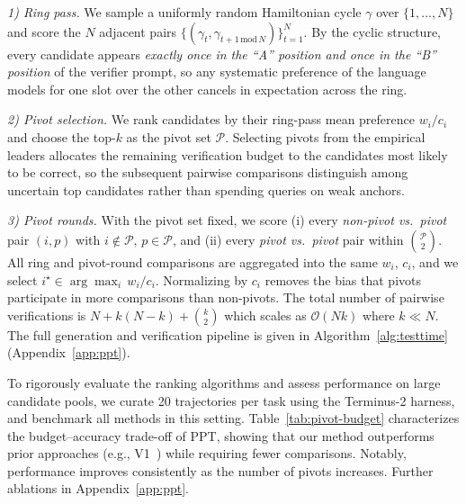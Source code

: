 \textit{1) Ring pass.} We sample a uniformly random Hamiltonian cycle $\gamma$ over $\{1,\ldots,N\}$ and score the $N$ adjacent pairs
$\{(\gamma_t,\gamma_{t+1 \,\mathrm{mod}\, N})\}_{t=1}^{N}$. By the cyclic structure, every candidate appears \emph{exactly once in the ``A'' position and once in the ``B'' position} of the verifier prompt, so any systematic preference of the language models for one slot over the other cancels in expectation across the ring.

\textit{2) Pivot selection.} We rank candidates by their ring-pass mean preference $w_i/c_i$ and choose the top-$k$ as the pivot set $\mathcal{P}$. Selecting pivots from the empirical leaders allocates the remaining verification budget to the candidates most likely to be correct, so the subsequent pairwise comparisons distinguish among uncertain top candidates rather than spending queries on weak anchors.

\textit{3) Pivot rounds.} With the pivot set fixed, we score (i) every \emph{non-pivot vs.\ pivot} pair $(i,p)$ with $i\!\notin\!\mathcal{P},\,p\!\in\!\mathcal{P}$, and (ii) every \emph{pivot vs.\ pivot} pair within $\binom{\mathcal{P}}{2}$. All ring and pivot-round comparisons are aggregated into the same $w_i$, $c_i$, and we select $i^\star \in \arg\max_i\,w_i/c_i$. Normalizing by $c_i$ removes the bias that pivots participate in more comparisons than non-pivots. The total number of pairwise verifications is $N + k(N-k) + \binom{k}{2}$ which scales as $\mathcal{O}(Nk)$ where $k\!\ll\!N$. The full generation and verification pipeline is given in Algorithm~\ref{alg:testtime} (Appendix~\ref{app:ppt}).

To rigorously evaluate the ranking algorithms and assess performance on large candidate pools, we curate 20 trajectories per task using the Terminus-2 harness, and benchmark all methods in this setting. Table~\ref{tab:pivot-budget} characterizes the budget–accuracy trade-off of PPT, showing that our method outperforms prior approaches (e.g., V1~\cite{singh_v_1_2026}) while requiring fewer comparisons. Notably, performance improves consistently as the number of pivots increases. Further ablations in Appendix~\ref{app:ppt}.